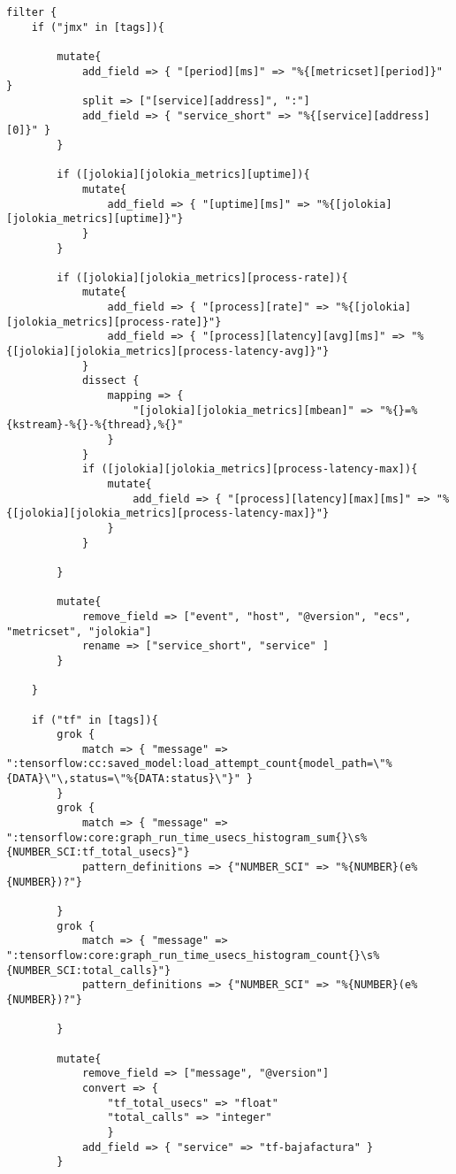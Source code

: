 \begin{verbatim}
filter {
    if ("jmx" in [tags]){
    
        mutate{
            add_field => { "[period][ms]" => "%{[metricset][period]}" }
            split => ["[service][address]", ":"]
            add_field => { "service_short" => "%{[service][address][0]}" }
        }

        if ([jolokia][jolokia_metrics][uptime]){
            mutate{
                add_field => { "[uptime][ms]" => "%{[jolokia][jolokia_metrics][uptime]}"}
            }
        }

        if ([jolokia][jolokia_metrics][process-rate]){
            mutate{
                add_field => { "[process][rate]" => "%{[jolokia][jolokia_metrics][process-rate]}"}
                add_field => { "[process][latency][avg][ms]" => "%{[jolokia][jolokia_metrics][process-latency-avg]}"}
            }
            dissect {
                mapping => {
                    "[jolokia][jolokia_metrics][mbean]" => "%{}=%{kstream}-%{}-%{thread},%{}"
                }
            }
            if ([jolokia][jolokia_metrics][process-latency-max]){
                mutate{
                    add_field => { "[process][latency][max][ms]" => "%{[jolokia][jolokia_metrics][process-latency-max]}"}
                }
            }

        }
        
        mutate{
            remove_field => ["event", "host", "@version", "ecs", "metricset", "jolokia"] 
            rename => ["service_short", "service" ] 
        }

    }
    
    if ("tf" in [tags]){
        grok {
            match => { "message" => ":tensorflow:cc:saved_model:load_attempt_count{model_path=\"%{DATA}\"\,status=\"%{DATA:status}\"}" }
        }
        grok {
            match => { "message" => ":tensorflow:core:graph_run_time_usecs_histogram_sum{}\s%{NUMBER_SCI:tf_total_usecs}"}
            pattern_definitions => {"NUMBER_SCI" => "%{NUMBER}(e%{NUMBER})?"}

        }
        grok {
            match => { "message" => ":tensorflow:core:graph_run_time_usecs_histogram_count{}\s%{NUMBER_SCI:total_calls}"}
            pattern_definitions => {"NUMBER_SCI" => "%{NUMBER}(e%{NUMBER})?"}

        }  

        mutate{
            remove_field => ["message", "@version"] 
            convert => {
                "tf_total_usecs" => "float"
                "total_calls" => "integer"
                }
            add_field => { "service" => "tf-bajafactura" }
        }


\end{verbatim}
